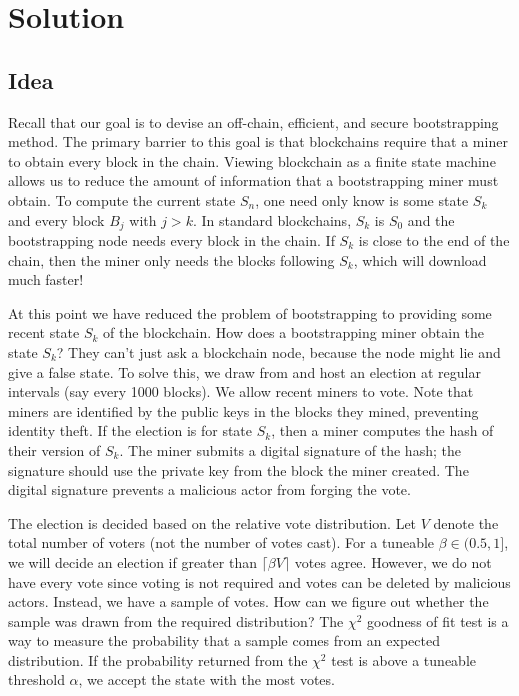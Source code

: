 \section{Solution}
\label{sec:solution}

\subsection{Idea}

Recall that our goal is to devise an off-chain, efficient, and secure bootstrapping method.
The primary barrier to this goal is that blockchains require that a miner to obtain every block in the chain.
Viewing blockchain as a finite state machine allows us to reduce the amount of information that a bootstrapping miner must obtain.
To compute the current state $S_n$, one need only know is some state $S_k$ and every block $B_j$ with $j > k$.
In standard blockchains, $S_k$ is $S_0$ and the bootstrapping node needs every block in the chain.
If $S_k$ is close to the end of the chain, then the miner only needs the blocks following $S_k$, which will download much faster!

At this point we have reduced the problem of bootstrapping to providing some recent state $S_k$ of the blockchain.
How does a bootstrapping miner obtain the state $S_k$?
They can't just ask a blockchain node, because the node might lie and give a false state.
To solve this, we draw from \cite{matzutt2020HowTSPrune} and host an election at regular intervals (say every 1000 blocks).
We allow recent miners to vote.
Note that miners are identified by the public keys in the blocks they mined, preventing identity theft.
If the election is for state $S_k$, then a miner computes the hash of their version of $S_k$.
The miner submits a digital signature of the hash; the signature should use the private key from the block the miner created.
The digital signature prevents a malicious actor from forging the vote.

The election is decided based on the relative vote distribution.
Let $V$ denote the total number of voters (not the number of votes cast).
For a tuneable $\beta \in (0.5,1]$, we will decide an election if greater than $\lceil \beta V \rceil$ votes agree.
However, we do not have every vote since voting is not required and votes can be deleted by malicious actors.
Instead, we have a sample of votes.
How can we figure out whether the sample was drawn from the required distribution?
The $\chi ^2$ goodness of fit test is a way to measure the probability that a sample comes from an expected distribution.
If the probability returned from the $\chi ^2$ test is above a tuneable threshold $\alpha$, we accept the state with the most votes.

